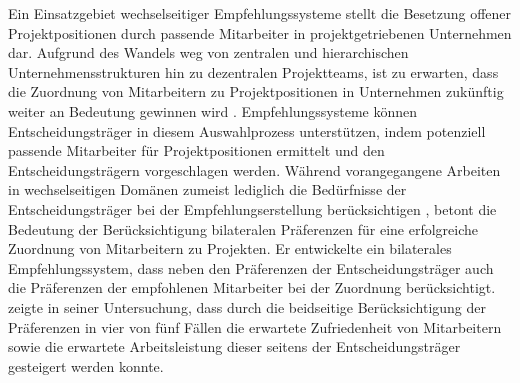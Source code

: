 Ein Einsatzgebiet wechselseitiger Empfehlungssysteme stellt die Besetzung offener Projektpositionen durch passende Mitarbeiter in projektgetriebenen Unternehmen dar.
Aufgrund des Wandels weg von zentralen und hierarchischen Unternehmensstrukturen hin zu dezentralen Projektteams, ist zu erwarten, dass die Zuordnung von Mitarbeitern zu Projektpositionen in Unternehmen zukünftig weiter an Bedeutung gewinnen wird \cite[S. 2]{link:booklet}. %
Empfehlungssysteme können Entscheidungsträger in diesem Auswahlprozess unterstützen, indem potenziell passende Mitarbeiter für Projektpositionen ermittelt und den Entscheidungsträgern vorgeschlagen werden.
Während vorangegangene Arbeiten in wechselseitigen Domänen zumeist lediglich die Bedürfnisse der Entscheidungsträger bei der Empfehlungserstellung berücksichtigen \cite[S. 2f.]{siting:2012}, betont \textcite[S. 2]{link:booklet} die Bedeutung der Berücksichtigung bilateralen Präferenzen für eine erfolgreiche Zuordnung von Mitarbeitern zu Projekten.
Er entwickelte ein bilaterales Empfehlungssystem, dass neben den Präferenzen der Entscheidungsträger auch die Präferenzen der empfohlenen Mitarbeiter bei der Zuordnung berücksichtigt.
\textcite[S. 3]{link:booklet} zeigte in seiner Untersuchung, dass durch die beidseitige Berücksichtigung der Präferenzen in vier von fünf Fällen die erwartete Zufriedenheit von Mitarbeitern sowie die erwartete Arbeitsleistung dieser seitens der Entscheidungsträger gesteigert werden konnte.

